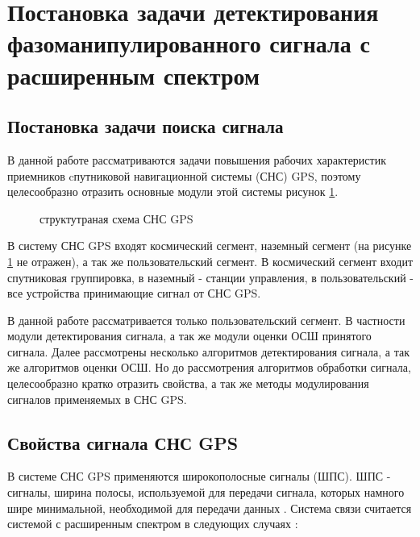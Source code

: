 \section{Постановка задачи детектирования фазоманипулированного сигнала с расширенным спектром}
\label{sec1_acq_algo}

\subsection{Постановка задачи поиска сигнала}
В данной работе рассматриваются задачи повышения рабочих характеристик приемников cпутниковой навигационной системы
(СНС) GPS, поэтому целесообразно
отразить основные модули этой системы рисунок \ref{pic:sec1_gnss_system}.
\begin{figure}[H]
\center{}
\caption{структутраная схема СНС GPS}
\label{pic:sec1_gnss_system}
\end{figure}

В систему СНС GPS входят космический сегмент, наземный сегмент (на рисунке \ref{pic:sec1_gnss_system} не
отражен), а так же пользовательский сегмент. В космический сегмент входит спутниковая группировка, в 
наземный - станции управления, в пользовательский - все устройства принимающие сигнал от СНС GPS.

В данной работе рассматривается только пользовательский сегмент. В частности модули детектирования сигнала,
а так же модули оценки ОСШ принятого сигнала. Далее рассмотрены несколько алгоритмов детектирования сигнала,
а так же алгоритмов оценки ОСШ. Но до рассмотрения алгоритмов обработки сигнала, целесообразно кратко 
отразить свойства, а так же методы модулирования сигналов применяемых в СНС GPS.

\subsection{Свойства сигнала СНС GPS}
В системе СНС GPS применяются широкополосные сигналы (ШПС).
ШПС - сигналы, ширина полосы, используемой для передачи сигнала, которых
намного шире минимальной, необходимой для передачи данных \cite{sklyar}. Система связи считается системой с расширенным
спектром в следующих случаях \cite{sklyar}:


